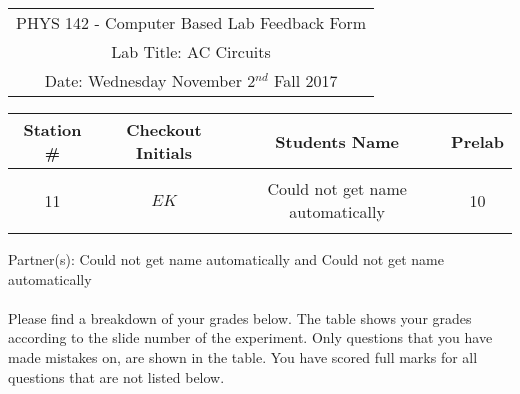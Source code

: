 \documentclass{article}
\begin{document}

\clearpage\clearpage\begin{table}[h]
	\centering
	\begin{tabular}{c}
	PHYS 142 - Computer Based Lab Feedback Form\\
	Lab Title: AC Circuits\\Date: Wednesday November 2$^{nd}$ Fall 2017 \\\hline
\end{tabular}
\end{table}
\begin{table}[h]\centering \begin{tabular}{|c|c|p{9.9 cm}|c|}\hline Station \#  & Checkout Initials & \multicolumn{1}{|c|}{Students Name} & Prelab \\\hline\multirow{3}{*}{11}& \multirow{3}{*}{$EK$} & &\\& &\multicolumn{1}{|c|}{Could not get name automatically}&10\\&   &  &\\\hline
\end{tabular}
\end{table}
Partner(s): Could not get name automatically and Could not get name automatically\\
\\Please find a breakdown of your grades below. The table shows your grades according to the slide number of the experiment. Only questions that you have made mistakes on, are shown in the table. You have scored full marks for all questions that are not listed below.
\end{document}
